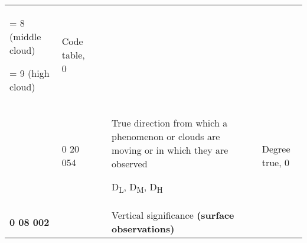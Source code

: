 \begin{longtable}[]{@{}lllll@{}}
\begin{minipage}[t]{0.17\columnwidth}
= 8 (middle cloud)

= 9 (high cloud)\strut
\end{minipage} & \begin{minipage}[t]{0.17\columnwidth}\raggedright
Code table, 0\strut
\end{minipage}\tabularnewline
\begin{minipage}[t]{0.17\columnwidth}\raggedright
\strut
\end{minipage} & \begin{minipage}[t]{0.17\columnwidth}\raggedright
0 20 054\strut
\end{minipage} & \begin{minipage}[t]{0.17\columnwidth}\raggedright
\strut
\end{minipage} & \begin{minipage}[t]{0.17\columnwidth}\raggedright
True direction from which a phenomenon or clouds are moving or in which they are observed

D\textsubscript{L}, D\textsubscript{M}, D\textsubscript{H}\strut
\end{minipage} & \begin{minipage}[t]{0.17\columnwidth}\raggedright
Degree true, 0\strut
\end{minipage}\tabularnewline
\begin{minipage}[t]{0.17\columnwidth}\raggedright
\textbf{0 08 002}\strut
\end{minipage} & \begin{minipage}[t]{0.17\columnwidth}\raggedright
\strut
\end{minipage} & \begin{minipage}[t]{0.17\columnwidth}\raggedright
\strut
\end{minipage} & \begin{minipage}[t]{0.17\columnwidth}\raggedright
Vertical significance \textbf{(surface observations)}


\end{minipage}
\end{longtable}

